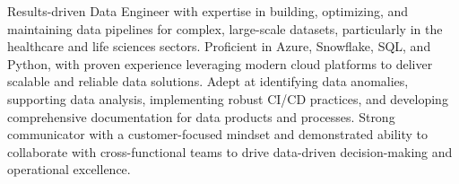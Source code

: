 \begin{onecolentry}
    Results-driven Data Engineer with expertise in building, optimizing, and maintaining data pipelines for complex, large-scale datasets, particularly in the healthcare and life sciences sectors. Proficient in Azure, Snowflake, SQL, and Python, with proven experience leveraging modern cloud platforms to deliver scalable and reliable data solutions. Adept at identifying data anomalies, supporting data analysis, implementing robust CI/CD practices, and developing comprehensive documentation for data products and processes. Strong communicator with a customer-focused mindset and demonstrated ability to collaborate with cross-functional teams to drive data-driven decision-making and operational excellence.
\end{onecolentry}